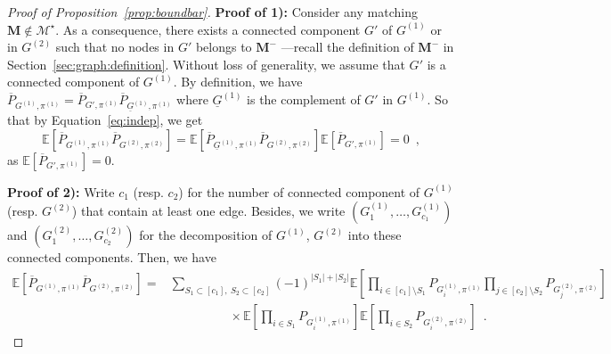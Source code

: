 \documentclass[final]{colt2026}
\newcommand{\1}{\mathbf{1}}
\begin{document}
\begin{proof}[Proof of Proposition~\ref{prop:boundbar}]

\noindent
{\bf Proof of 1):} Consider any matching $\mathbf M \not\in \mathcal M^\star$. As a consequence, there exists a connected component $G'$ of $G^{(1)}$ or in $G^{(2)}$ such that no nodes in $G'$ belongs to $\mathbf{M}^{-}$ ---recall the definition of $\mathbf{M}^{-}$ in Section~\ref{sec:graph:definition}. Without loss of generality, we assume that $G'$ is a connected component of $G^{(1)}$. By definition, we have  $\overline{P}_{G^{(1)}, \pi^{(1)}} = \overline{P}_{G', \pi^{(1)}} \overline{P}_{\underline{G}^{(1)}, \pi^{(1)}}$ where $\underline{G}^{(1)}$ is the complement of $G'$ in $G^{(1)}$. So that by Equation~\eqref{eq:indep}, we get
$$\mathbb E[\overline{P}_{G^{(1)}, \pi^{(1)}}\overline{P}_{G^{(2)}, \pi^{(2)}}] = \mathbb E[\overline{P}_{\underline{G}^{(1)}, \pi^{(1)}}\overline{P}_{G^{(2)}, \pi^{(2)}}] \mathbb E[\overline{P}_{G', \pi^{(1)}}] = 0\enspace ,$$
as $\mathbb E[\overline{P}_{G', \pi^{(1)}}]=0$.

\noindent
{\bf Proof of 2):} Write $c_1$ (resp. $c_2$) for the number of connected component of $G^{(1)}$ (resp. $G^{(2)}$) that contain at least one edge. Besides, we write $(G_1^{(1)}, \ldots, G^{(1)}_{c_1})$ and  $(G_1^{(2)}, \ldots, G^{(2)}_{c_2})$ for the decomposition of $G^{(1)}$, $G^{(2)}$ into these connected components. Then, we have 
\begin{align*}
    \mathbb{E}\left[\overline{P}_{G^{(1)}, \pi^{(1)}}\overline{P}_{G^{(2)}, \pi^{(2)}}\right] = & \sum_{S_1 \subset [c_1],\  S_2 \subset [c_2]} (-1)^{|S_1|+|S_2|}\mathbb E\left[\prod_{i\in [c_1]\setminus S_1}P_{G^{(1)}_i,\pi^{(1)}}\prod_{j\in [c_2]\setminus S_2}P_{G^{(2)}_j,\pi^{(2)}}\right] \\&  \hspace{2cm}\times \mathbb E\left[\prod_{i\in S_1}P_{G^{(1)}_i,\pi^{(1)}}\right]\mathbb E\left[\prod_{i\in S_2}P_{G^{(2)}_i,\pi^{(2)}}\right]\enspace . 
\end{align*}



\end{proof}
\end{document}
